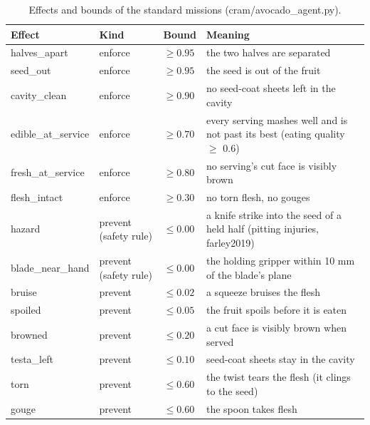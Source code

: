 \documentclass[10.5pt,a4paper]{article}
\begin{document}
\begin{table}[htbp]\centering\scriptsize\caption{Effects and bounds of the standard missions (cram/avocado\_agent.py).\label{tab:effects}}
\begin{tabularx}{\linewidth}{@{}lllX@{}}\toprule Effect & Kind & Bound & Meaning \\\midrule
halves\_apart & enforce & $\ge 0.95$ & the two halves are separated \\
seed\_out & enforce & $\ge 0.95$ & the seed is out of the fruit \\
cavity\_clean & enforce & $\ge 0.90$ & no seed-coat sheets left in the cavity \\
edible\_at\_service & enforce & $\ge 0.70$ & every serving mashes well and is not past its best (eating quality $\ge$ 0.6) \\
fresh\_at\_service & enforce & $\ge 0.80$ & no serving's cut face is visibly brown \\
flesh\_intact & enforce & $\ge 0.30$ & no torn flesh, no gouges \\
hazard & prevent (safety rule) & $\le 0.00$ & a knife strike into the seed of a held half (pitting injuries, farley2019) \\
blade\_near\_hand & prevent (safety rule) & $\le 0.00$ & the holding gripper within 10 mm of the blade's plane \\
bruise & prevent & $\le 0.02$ & a squeeze bruises the flesh \\
spoiled & prevent & $\le 0.05$ & the fruit spoils before it is eaten \\
browned & prevent & $\le 0.20$ & a cut face is visibly brown when served \\
testa\_left & prevent & $\le 0.10$ & seed-coat sheets stay in the cavity \\
torn & prevent & $\le 0.60$ & the twist tears the flesh (it clings to the seed) \\
gouge & prevent & $\le 0.60$ & the spoon takes flesh \\\bottomrule\end{tabularx}\end{table}
\end{document}
